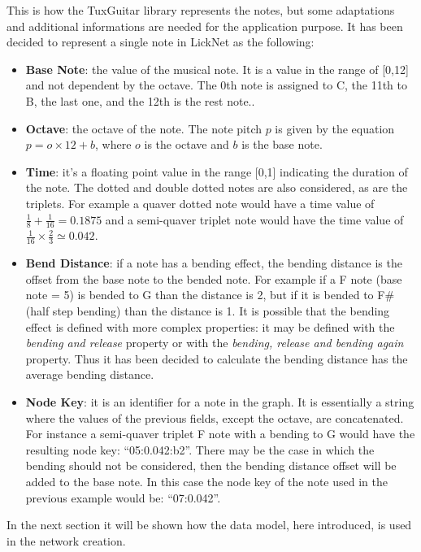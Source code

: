 \documentclass{llncs}
\begin{document}
This is how the TuxGuitar library represents the notes, but some
adaptations and additional 
informations are needed for the application purpose. It has been decided
to represent a single note in LickNet as the following:
\begin{itemize}
	\item \textbf{Base Note}: the value of the musical note. It is
a value in the range of [0,12] and not dependent by the octave. The 0th
note is assigned to C, the 11th to B, the last one, and the 12th is the
rest note..
	\item \textbf{Octave}: the octave of the note. The note pitch $p$ is given
by the equation $p = o \times 12 + b $, where $o$ is the octave and $b$
is the base note.
	\item \textbf{Time}: it's a floating point value in the range [0,1] indicating the duration of
the note. The dotted and double dotted notes are also considered, as are
the triplets. For example a quaver dotted note would have a
time value of $\frac{1}{8} + \frac{1}{16} = 0.1875$ and a semi-quaver triplet note
would have the time value of $\frac{1}{16} \times \frac{2}{3} \simeq 0.042$.
	\item \textbf{Bend Distance}: if a note has a bending effect, the bending
distance is the offset from the base note to the bended note. For
example if a F note (base note = 5) is bended to G than the distance is
2, but if it is bended to F\# (half step bending) than the distance is 1. It
is possible that the bending effect is defined with more complex
properties: it may be defined with the \emph{bending and release}
property or with the \emph{bending,
release and bending again} property. Thus it has been decided to calculate
the bending distance has the average bending distance.
	\item \textbf{Node Key}: it is an identifier for a note in the graph. It is
essentially a string where the values of the previous fields, except the
octave, are
concatenated. For instance a semi-quaver triplet F note with a bending
to G would have the resulting node key: ``05:0.042:b2''. There may be the
case in which the bending should not be considered, then the bending distance offset 
will be added to the base note. In this case the node key of the note
used in the
previous example would be: ``07:0.042''.
\end{itemize}

In the next section it will be shown how the data model, here introduced, is used in the
network creation.
\end{document}
